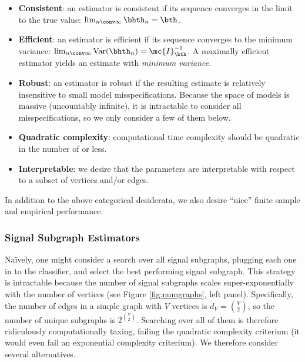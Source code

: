 \documentclass[10pt,journal,cspaper,compsoc]{IEEEtran}
\begin{document}
\begin{itemize}
	\item \textbf{Consistent}: an estimator is consistent if its sequence converges in the limit to the true value: $\lim_{n \conv \infty} \bhth_n = \bth$.  %
	\item \textbf{Efficient}: an estimator is efficient if its sequence converges to the minimum variance: $\lim_{n\conv\infty} \text{Var}(\bhth_n) = \mc{I}_{\bth}^{-1}$.  %
	A maximally efficient estimator yields an estimate with \emph{minimum variance}.
	\item \textbf{Robust}: an estimator is robust if the resulting estimate is relatively insensitive to small model misspecifications.  Because the space of models is massive (uncountably infinite), it is intractable to consider all misspecifications, so we only consider a few of them below. %
	\item \textbf{Quadratic complexity}: computational time complexity should be quadratic in the number of  or less.
	\item \textbf{Interpretable}: we desire that the parameters are interpretable with respect to a subset of vertices and/or edges.
\end{itemize}
In addition to the above categorical desiderata, we also desire ``nice'' finite sample and empirical performance.


\subsubsection{Signal Subgraph Estimators} %
\label{ssub:subsubsection_name1}


Na\"{i}vely, one might consider a search over all signal subgraphs, plugging each one in to the classifier, and select the best performing signal subgraph.  This strategy is intractable because the number of signal subgraphs scales super-exponentially with the number of vertices (see Figure \ref{fig:numgraphs}, left panel). Specifically, the number of edges in a simple graph with $V$ vertices is $d_V=\binom{V}{2}$, so the number of unique subgraphs is $2^{\binom{V}{2}}$.  Searching over all of them is therefore ridiculously computationally taxing, failing the quadratic complexity criterium (it would even fail an exponential complexity criterium). %
We therefore consider several alternatives.
\end{document}
